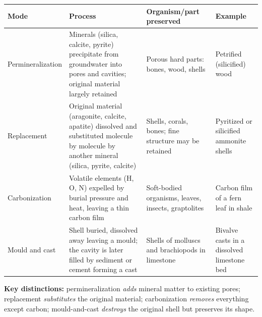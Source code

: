 \documentclass[11pt]{article}
\begin{document}
\begin{corrige}
\begin{center}
\begin{tabularx}{\linewidth}{|l|X|X|X|}\hline
\rowcolor{popblueL} \textbf{Mode} & \textbf{Process} & \textbf{Organism/part preserved} & \textbf{Example} \\ \hline
Permineralization & Minerals (silica, calcite, pyrite) precipitate from groundwater into pores and cavities; original material largely retained & Porous hard parts: bones, wood, shells & Petrified (silicified) wood \\ \hline
Replacement & Original material (aragonite, calcite, apatite) dissolved and substituted molecule by molecule by another mineral (silica, pyrite, calcite) & Shells, corals, bones; fine structure may be retained & Pyritized or silicified ammonite shells \\ \hline
Carbonization & Volatile elements (H, O, N) expelled by burial pressure and heat, leaving a thin carbon film & Soft-bodied organisms, leaves, insects, graptolites & Carbon film of a fern leaf in shale \\ \hline
Mould and cast & Shell buried, dissolved away leaving a mould; the cavity is later filled by sediment or cement forming a cast & Shells of molluscs and brachiopods in limestone & Bivalve casts in a dissolved limestone bed \\ \hline
\end{tabularx}
\end{center}
\textbf{Key distinctions:} permineralization \emph{adds} mineral matter to existing pores; replacement \emph{substitutes} the original material; carbonization \emph{removes} everything except carbon; mould-and-cast \emph{destroys} the original shell but preserves its shape.
\end{corrige}
\end{document}
